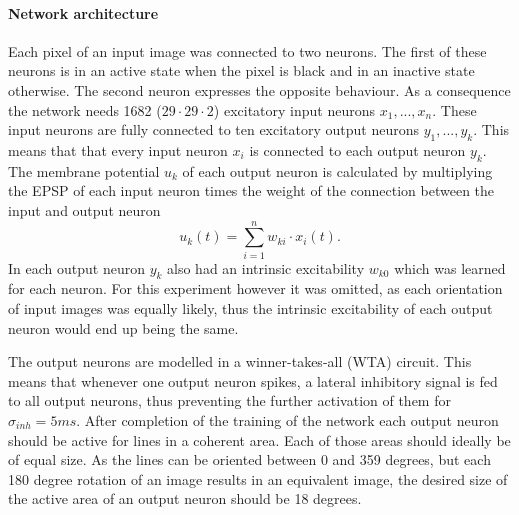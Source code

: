 \paragraph{Network architecture}
Each pixel of an input image was connected to two neurons. The first of these neurons is in an active state when the pixel is black and in an inactive state otherwise. The second neuron expresses the opposite behaviour. As a consequence the network needs 1682 ($29 \cdot 29 \cdot 2$) excitatory input neurons $x_1,...,x_n$. These input neurons are fully connected to ten excitatory output neurons $y_1,...,y_k$. This means that that every input neuron $x_i$ is connected to each output neuron $y_k$. The membrane potential $u_k$ of each output neuron is calculated by multiplying the EPSP of each input neuron times the weight of the connection between the input and output neuron 
\begin{equation}
\label{eqn:uk}
u_k(t) = \sum_{i=1}^n w_{ki} \cdot x_i(t).
\end{equation}
In \citet{nessler} each output neuron $y_k$ also had an intrinsic excitability $w_{k0}$ which was learned for each neuron. For this experiment however it was omitted, as each orientation of input images was equally likely, thus the intrinsic excitability of each output neuron would end up being the same.

The output neurons are modelled in a winner-takes-all (WTA) circuit. This means that whenever one output neuron spikes, a lateral inhibitory signal is fed to all output neurons, thus preventing the further activation of them for $\sigma_{inh} = 5 ms$. After completion of the training of the network each output neuron should be active for lines in a coherent area. Each of those areas should ideally be of equal size. As the lines can be oriented between 0 and 359 degrees, but each 180 degree rotation of an image results in an equivalent image, the desired size of the active area of an output neuron should be 18 degrees.


